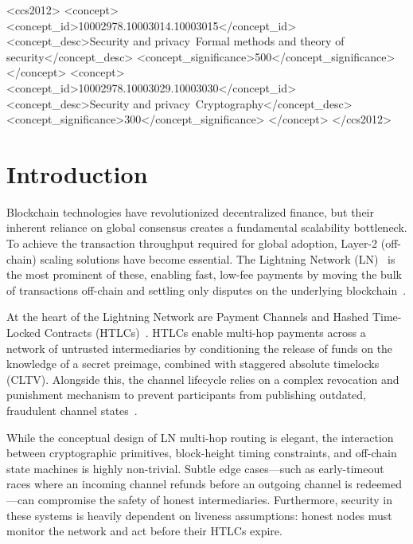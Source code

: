 \documentclass[sigconf,review]{acmart}
\theoremstyle{acmdefinition}
\begin{document}
\begin{CCSXML}
<ccs2012>
<concept>
<concept_id>10002978.10003014.10003015</concept_id>
<concept_desc>Security and privacy~Formal methods and theory of security</concept_desc>
<concept_significance>500</concept_significance>
</concept>
<concept>
<concept_id>10002978.10003029.10003030</concept_id>
<concept_desc>Security and privacy~Cryptography</concept_desc>
<concept_significance>300</concept_significance>
</concept>
</ccs2012>
\end{CCSXML}



\maketitle

\section{Introduction}

Blockchain technologies have revolutionized decentralized finance, but their inherent reliance on global consensus creates a fundamental scalability bottleneck. To achieve the transaction throughput required for global adoption, Layer-2 (off-chain) scaling solutions have become essential. The Lightning Network (LN)~\cite{poon2016bitcoin} is the most prominent of these, enabling fast, low-fee payments by moving the bulk of transactions off-chain and settling only disputes on the underlying blockchain~\cite{gudgeon2020sok}.

At the heart of the Lightning Network are Payment Channels and Hashed Time-Locked Contracts (HTLCs)~\cite{bolt2024}. HTLCs enable multi-hop payments across a network of untrusted intermediaries by conditioning the release of funds on the knowledge of a secret preimage, combined with staggered absolute timelocks (CLTV). Alongside this, the channel lifecycle relies on a complex revocation and punishment mechanism to prevent participants from publishing outdated, fraudulent channel states~\cite{maffei2024lecture}.

While the conceptual design of LN multi-hop routing is elegant, the interaction between cryptographic primitives, block-height timing constraints, and off-chain state machines is highly non-trivial. Subtle edge cases---such as early-timeout races where an incoming channel refunds before an outgoing channel is redeemed---can compromise the safety of honest intermediaries. Furthermore, security in these systems is heavily dependent on liveness assumptions: honest nodes must monitor the network and act before their HTLCs expire.
\end{document}
